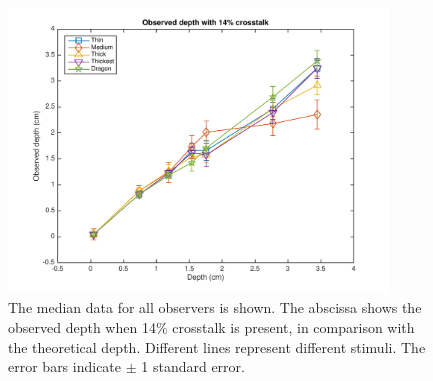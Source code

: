 \begin{figure}[H]
\centering
    \includegraphics[width=0.9\textwidth]{./Template_Figures/a_crosstalk_14}
    \caption{The median data for all observers is shown. The abscissa shows the observed depth when 14\% crosstalk is present, in comparison with the theoretical depth. Different lines represent different stimuli. The error bars indicate $\pm$ 1 standard error.\label{fig:a_crosstalk_14}}
\end{figure}

